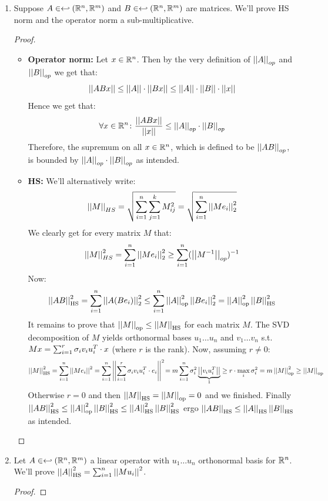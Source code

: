 \documentclass[a4paper]{article}
\newcommand\opn[1]{\norm{#1}_{\mathrm{op}}}
\newcommand\hsn[1]{\norm{#1}_{\mathrm{HS}}}
\begin{document}
	\section{}
	\begin{enumerate}
		\item Suppose $A \in \hookleftarrow(\mathbb{R}^{n}, \mathbb{R}^{m})$ and $B \in \hookleftarrow(\mathbb{R}^{n}, \mathbb{R}^{m})$ are matrices. We'll prove HS norm and the operator norm a sub-multiplicative. \begin{proof}
			\begin{itemize}
				\item \textbf{Operator norm: }Let $x \in \mathbb{R}^{n}$. Then by the very definition of $\left \vert \left \vert A \right \vert \right \vert_{op}$ and $\left \vert \left \vert B \right \vert \right \vert_{op}$ we get that: 
				\[ \left \vert \left \vert ABx \right \vert \right \vert \le \left \vert \left \vert A \right \vert \right \vert \cdot \left \vert \left \vert Bx \right \vert \right \vert \le \left \vert \left \vert A \right \vert \right \vert \cdot \left \vert \left \vert B \right \vert \right \vert \cdot \left \vert \left \vert x \right \vert \right \vert \]
				Hence we get that: 
				\[ \forall x \in \mathbb{R}^{n} \colon \frac{\left \vert \left \vert ABx \right \vert \right \vert}{\left \vert \left \vert x \right \vert \right \vert} \le \left \vert \left \vert A \right \vert \right \vert_{op} \cdot \left \vert \left \vert B \right \vert \right \vert_{op} \]
				Therefore, the supremum on all $x \in \mathbb{R}^{n}$, which is defined to be $\left \vert \left \vert AB \right \vert \right \vert_{op}$, is bounded by $\left \vert \left \vert A \right \vert \right \vert_{op} \cdot \left \vert \left \vert B \right \vert \right \vert_{op}$ as intended. 
				\item \textbf{HS: }We'll alternatively write: 
				\[ \left \vert \left \vert M \right \vert \right \vert_{HS} = \sqrt{\sum_{i =1}^{n}\sum_{j= 1}^{k}M_{ij}^{2}} = \sqrt{\sum_{i =1}^{n}\left \vert \left \vert Me_i \right \vert \right \vert_2^{2}} \]
				We clearly get for every matrix $M$ that: 
				\[ \left \vert \left \vert M \right \vert \right \vert_{HS}^{2} = \sum_{i= 1}^{n}\left \vert \left \vert Me_i \right \vert \right \vert_2^{2} \ge \sum_{i= 1}^{n}(\left \vert \left \vert M^{-1} \right \vert \right \vert_{op})^{-1} \]
				Now: 
				\[ \hsn{AB}^{2} = \sum_{i =1}^{n}\norm{A(Be_i)}_2^{2} \le \sum_{i = 1}^{n}\opn{A}^{2}\norm{Be_i}_{2}^{2} = \opn{A}^{2} \hsn{B}^{2} \]
				It remains to prove that $\opn{M}\le \hsn{M}$ for each matrix $M$. The SVD decomposition of $M$ yields orthonormal bases $u_1 \dots u_n$ and $v_1 \dots v_n$ s.t. $Mx = \sum_{i = 1}^{r}\sigma_i v_iu_i^{T} \cdot x$ (where $r$ is the rank). Now, assuming $r \neq 0$: 
				\[ \hsn{M}^{2} = \sum_{i= 1}^{n}\norm{Me_i}^{2} = \sum_{i= 1}^{n}\norm{\sum_{i = 1}^{r}\sg_iv_iu_i^{T} \cdot e_i}^{2} \!= m \sum_{i= 1}^{n}\sg_i^{2}\underbrace{\norm{v_iu_i^{T}}}_{1} \ge r \cdot \max_i \sg_i^{2} = m \opn{M}^{2} \ge \opn{M} \]
				Otherwise $r = 0$ and then $\hsn{M} = \opn{M} = 0$ and we finished. 
				Finally $\hsn{AB}^{2} \le \opn{A}^{2}\hsn{B}^{2} \le \hsn{A}^{2}\hsn{B}^{2}$ ergo $\hsn{AB} \le \hsn{A}\hsn{B}$ as intended. 
			\end{itemize}
		\end{proof}
		\item Let $A \in \hookleftarrow(\mathbb{R}^{n}, \mathbb{R}^{m})$ a linear operator with $u_1 \dots u_n$ orthonormal basis for $\mathbb{R}^{n}$. We'll prove $\hsn{A}^{2} = \sum_{i = 1}^{n}\norm{Mu_i}^{2}$. \begin{proof}

\end{proof}
\end{enumerate}
\end{document}
